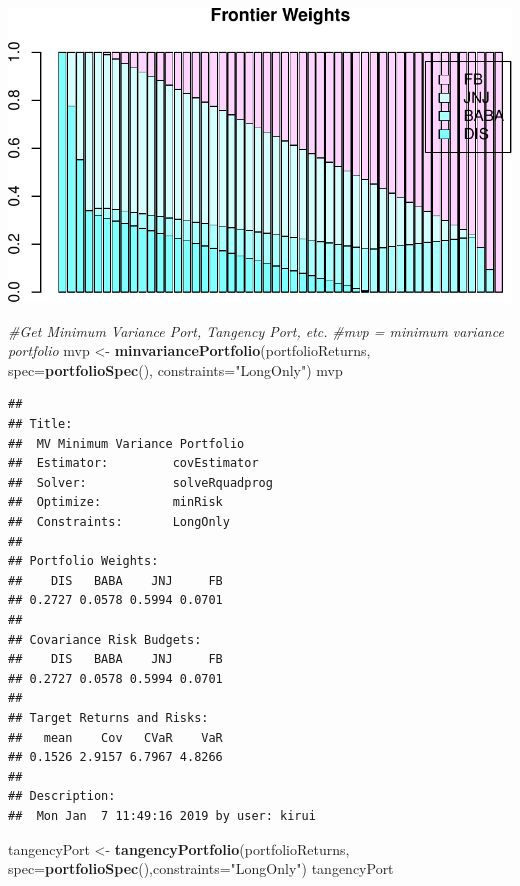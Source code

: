 \documentclass[]{article}
\newenvironment{Shaded}{\begin{snugshade}}{\end{snugshade}}
\newcommand{\KeywordTok}[1]{\textcolor[rgb]{0.13,0.29,0.53}{\textbf{#1}}}
\newcommand{\DataTypeTok}[1]{\textcolor[rgb]{0.13,0.29,0.53}{#1}}
\newcommand{\StringTok}[1]{\textcolor[rgb]{0.31,0.60,0.02}{#1}}
\newcommand{\CommentTok}[1]{\textcolor[rgb]{0.56,0.35,0.01}{\textit{#1}}}
\newcommand{\NormalTok}[1]{#1}
\begin{document}
\includegraphics{Markowitz_Research_Me_files/figure-latex/unnamed-chunk-19-6.pdf}

\begin{Shaded}
\begin{Highlighting}[]
\CommentTok{#Get Minimum Variance Port, Tangency Port, etc.}
\CommentTok{#mvp = minimum variance portfolio}
\NormalTok{mvp <-}\StringTok{ }\KeywordTok{minvariancePortfolio}\NormalTok{(portfolioReturns,}
                            \DataTypeTok{spec=}\KeywordTok{portfolioSpec}\NormalTok{(), }\DataTypeTok{constraints=}\StringTok{"LongOnly"}\NormalTok{)}
\NormalTok{mvp}
\end{Highlighting}
\end{Shaded}

\begin{verbatim}
## 
## Title:
##  MV Minimum Variance Portfolio 
##  Estimator:         covEstimator 
##  Solver:            solveRquadprog 
##  Optimize:          minRisk 
##  Constraints:       LongOnly 
## 
## Portfolio Weights:
##    DIS   BABA    JNJ     FB 
## 0.2727 0.0578 0.5994 0.0701 
## 
## Covariance Risk Budgets:
##    DIS   BABA    JNJ     FB 
## 0.2727 0.0578 0.5994 0.0701 
## 
## Target Returns and Risks:
##   mean    Cov   CVaR    VaR 
## 0.1526 2.9157 6.7967 4.8266 
## 
## Description:
##  Mon Jan  7 11:49:16 2019 by user: kirui
\end{verbatim}

\begin{Shaded}
\begin{Highlighting}[]
\NormalTok{tangencyPort <-}\StringTok{ }\KeywordTok{tangencyPortfolio}\NormalTok{(portfolioReturns,}
                                  \DataTypeTok{spec=}\KeywordTok{portfolioSpec}\NormalTok{(),}\DataTypeTok{constraints=}\StringTok{"LongOnly"}\NormalTok{)}
\NormalTok{tangencyPort}
\end{Highlighting}
\end{Shaded}
\end{document}
